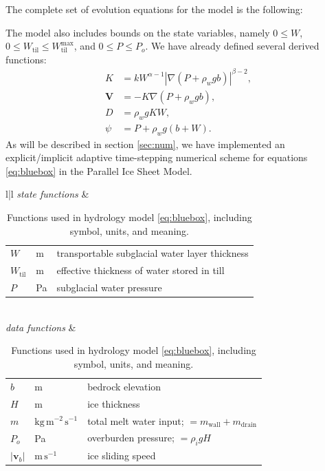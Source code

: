 \documentclass[11pt,final]{amsart}
\newcommand*\mybluebox[1]{%
\colorbox{myblue}{\hspace{1em}#1\hspace{1em}}}
\newcommand\bv{\mathbf{v}}
\newcommand\bV{\mathbf{V}}
\newcommand{\ddt}[1]{\ensuremath{\frac{\partial #1}{\partial t}}}
\newcommand{\Div}{\nabla\cdot}
\newcommand{\grad}{\nabla}
\newcommand{\Wtil}{W_{\text{til}}}
\newcommand{\Wtilmax}{W_{\text{til}}^{\text{max}}}
\begin{document}
The complete set of evolution equations for the model is the following:
The model also includes bounds on the state variables, namely $0\le W$, $0\le \Wtil \le \Wtilmax$, and $0 \le P \le P_o$.  We have already defined several derived functions:
\begin{align*}
K &= k W^{\alpha-1} \left|\grad(P+\rho_w g b)\right|^{\beta-2}, \\
\bV   &= - K \grad\left(P + \rho_w g b\right), \\
D     &= \rho_w g K W, \\
\psi &= P + \rho_w g (b + W).
\end{align*}
As will be described in section \ref{sec:num}, we have implemented an explicit/implicit adaptive time-stepping numerical scheme for equations \eqref{eq:bluebox} in the Parallel Ice Sheet Model.

\begin{table}[ht]
\caption{Functions used in hydrology model \eqref{eq:bluebox}, including symbol, units, and meaning.}
\begin{tabular}{l|l}
\hline
\emph{state functions} & \begin{tabular}{lll}
        $W$ & m \phantom{llllllllllll\,} & transportable subglacial water layer thickness \\
        $\Wtil$ & m & effective thickness of water stored in till \\
        $P$ & Pa & subglacial water pressure \\
        \end{tabular} \\ \hline
\emph{data functions} &  \begin{tabular}{lll}
        $b$ & m & bedrock elevation \\
        $H$ & m & ice thickness \\
        $m$ & $\text{kg}\,\text{m}^{-2}\,\text{s}^{-1}$ & total melt water input; $=m_{\text{wall}}+m_{\text{drain}}$ \\
        $P_o$ & Pa & overburden pressure; $= \rho_i g H$ \\
        $|\bv_b|$ & $\text{m}\,\text{s}^{-1}$ & ice sliding speed \\
        \end{tabular} \\ \hline
\end{tabular}
\label{tab:symbols}
\end{table}
\end{document}
